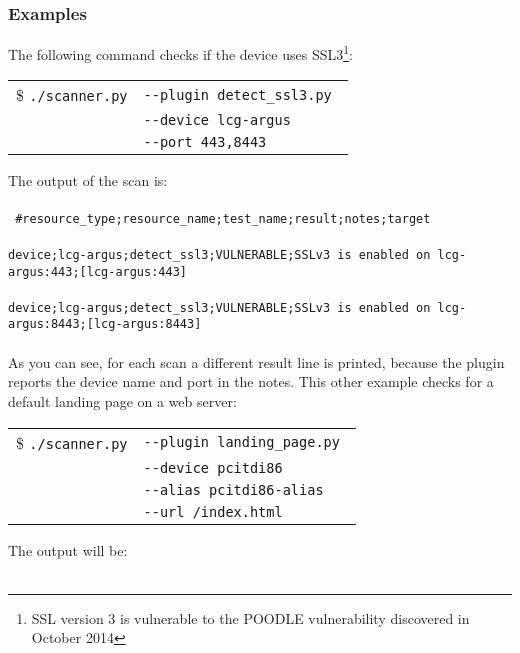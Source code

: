 \subsubsection{Examples}
The following command checks if the device uses SSL3\footnote{SSL version 3 is vulnerable to the POODLE vulnerability discovered in October 2014}:
\begin{table}[H]

    \begin{tabular}{ c  l }


\$ \texttt{./scanner.py} & \texttt{-{}-plugin detect\_ssl3.py } \\
  & \texttt{-{}-device lcg-argus} \\
  & \texttt{-{}-port 443,8443}    	       
	\end{tabular}    

\end{table}
\noindent
The output of the scan is: 
\\
\\
\texttt{
\#resource\_type;resource\_name;test\_name;result;notes;target}
\\
\\
\texttt{device;lcg-argus;detect\_ssl3;VULNERABLE;SSLv3 is enabled on lcg-argus:443;[lcg-argus:443]}
\\
\\
\texttt{device;lcg-argus;detect\_ssl3;VULNERABLE;SSLv3 is enabled on lcg-argus:8443;[lcg-argus:8443]}
\\
\\
As you can see, for each scan a different result line is printed, because the plugin reports the device name and port in the notes. 
This other example checks for a default landing page on a web server:
\begin{table}[H]

    \begin{tabular}{ c  l }


\$ \texttt{./scanner.py} & \texttt{-{}-plugin landing\_page.py } \\
  & \texttt{-{}-device pcitdi86} \\
  & \texttt{-{}-alias pcitdi86-alias}\\    	       
    & \texttt{-{}-url /index.html}\\ 
	\end{tabular}    

\end{table}
\noindent
The output will be:
\\
\\
